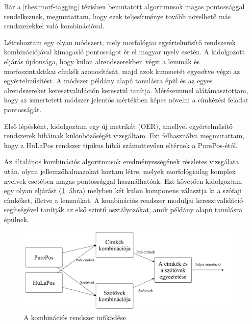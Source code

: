 \thesisline%


Bár a \ref{thes:morf-tagging} tézisben bemutatott algoritmusok magas pontossággal rendelkeznek, megmutattam, hogy ezek teljesítménye tovább növelhető más rendszerekkel való kombinációval. 

\begin{core}
\begin{thesis}
Létrehoztam egy olyan módszert, mely morfológiai egyértelműsítő rendszerek kombinációjával kimagasló pontosságot ér el magyar nyelv esetén.
A kidolgozott eljárás újdonsága, hogy külön alrendszerekben végzi a lemmák és morfoszintaktikai címkék azonosítását, majd azok kimenetét egyesítve végzi az egyértelműsítést.
A módszer példány alapú tanulásra épül és az egyes alrendszereket keresztvalidáción keresztül tanítja.
Méréseimmel alátámasztottam, hogy az ismertetett módszer jelentős mértékben képes növelni a címkézési feladat pontosságát. 
\end{thesis}

\begin{pub}
\cite{Laki2013a,Orosz2013c,Orosz2013d} 
\end{pub}
\end{core}

Első lépésként, kidolgoztam egy új metrikát (OER), amellyel egyértelműsítő rendszerek hibáinak különbözőségét vizsgáltam. 
Ezt felhasználva megmutattam, hogy a HuLaPos rendszer tipikus hibái számottevően eltérnek a PurePos-étól. 

Az általános kombinációs algoritmusok eredményességének részletes vizsgálata után, olyan jellemzőhalmazokat hoztam létre, melyek morfológiailag komplex nyelvek esetében magas pontossággal használhatóak.
Ezt követően kidolgoztam egy olyan eljárást (\ref{fig:comb3_en}. ábra) melyben két külön komponens választja ki a szófaji címkéket, illetve a lemmákat. 
A kombinációs rendszer moduljai keresztvalidáció segítségével tanítják az első szintű osztályozókat, amik példány alapú tanulásra épülnek.

\begin{figure}[H]
  \centering %
  \includegraphics[scale=0.15]{MorphTagging/comb3_hu.png} 
  \caption{A kombinációs rendszer működése}
  \label{fig:comb3_en}
\end{figure}

